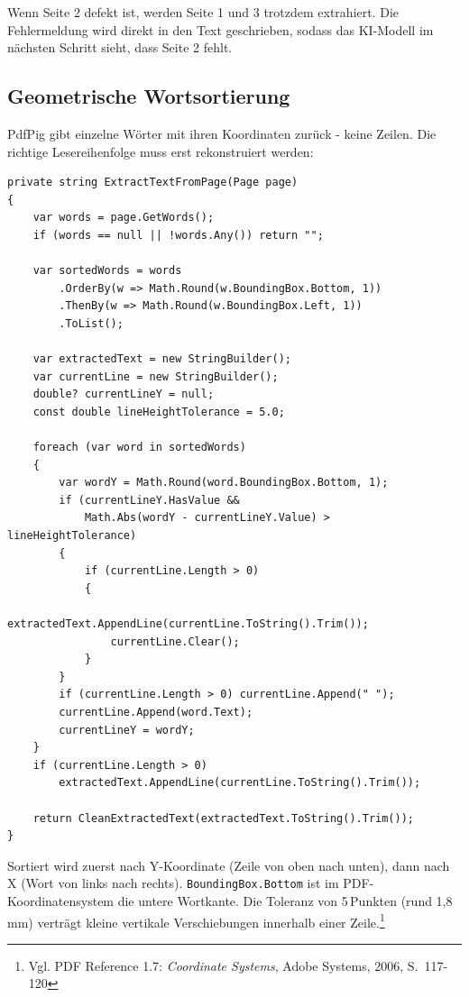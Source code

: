 Wenn Seite 2 defekt ist, werden Seite 1 und 3 trotzdem extrahiert. Die Fehlermeldung wird direkt in den Text geschrieben, sodass das KI-Modell im nächsten Schritt sieht, dass Seite 2 fehlt.

\subsection{Geometrische Wortsortierung}

PdfPig gibt einzelne Wörter mit ihren Koordinaten zurück - keine Zeilen. Die richtige Lesereihenfolge muss erst rekonstruiert werden:

\begin{lstlisting}[language={[Sharp]C}, caption={Geometrische Wort-Sortierung}, label={lst:word_extraction}]
private string ExtractTextFromPage(Page page)
{
    var words = page.GetWords();
    if (words == null || !words.Any()) return "";

    var sortedWords = words
        .OrderBy(w => Math.Round(w.BoundingBox.Bottom, 1))
        .ThenBy(w => Math.Round(w.BoundingBox.Left, 1))
        .ToList();

    var extractedText = new StringBuilder();
    var currentLine = new StringBuilder();
    double? currentLineY = null;
    const double lineHeightTolerance = 5.0;

    foreach (var word in sortedWords)
    {
        var wordY = Math.Round(word.BoundingBox.Bottom, 1);
        if (currentLineY.HasValue && 
            Math.Abs(wordY - currentLineY.Value) > lineHeightTolerance)
        {
            if (currentLine.Length > 0)
            {
                extractedText.AppendLine(currentLine.ToString().Trim());
                currentLine.Clear();
            }
        }
        if (currentLine.Length > 0) currentLine.Append(" ");
        currentLine.Append(word.Text);
        currentLineY = wordY;
    }
    if (currentLine.Length > 0)
        extractedText.AppendLine(currentLine.ToString().Trim());

    return CleanExtractedText(extractedText.ToString().Trim());
}
\end{lstlisting}

Sortiert wird zuerst nach Y-Koordinate (Zeile von oben nach unten), dann nach X (Wort von links nach rechts). \texttt{BoundingBox.Bottom} ist im PDF-Koordinatensystem die untere Wortkante. Die Toleranz von 5\,Punkten (rund 1,8\,mm) verträgt kleine vertikale Verschiebungen innerhalb einer Zeile.\footnote{Vgl. PDF Reference 1.7: \textit{Coordinate Systems}, Adobe Systems, 2006, S.~117-120}

